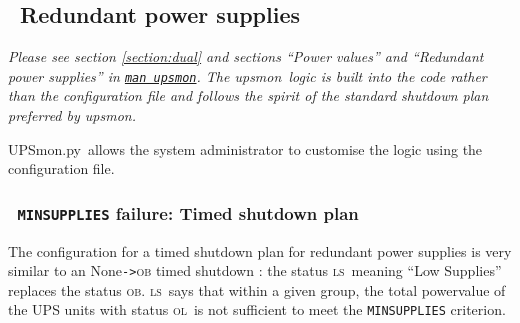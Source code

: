 \documentclass[12pt]{article}
\newlength{\headersep}\setlength{\headersep}{3mm}
\newcommand{\Hsep}{\hspace{\headersep}}
\newcommand{\upsmon}{\mbox{\textcolor{MONCOLOUR}{upsmon}}}
\newcommand{\UPSmon}{\mbox{\textcolor{UPSMONCOLOUR}{UPSmon.py}}}
\newcommand{\OB}{\textcolor{UPSDCOLOUR}{\textsc{ob}}}
\newcommand{\OL}{\textcolor{UPSDCOLOUR}{\textsc{ol}}}
\newcommand{\LS}{\textcolor{UPSMONCOLOUR}{\textsc{ls}}}
\newcommand{\None}{\textcolor{UPSMONCOLOUR}{\textsf{None}}}
\newcommand{\EVENT}[2]{\textcolor{MONCOLOUR}{#1}{\allowbreak}\texttt{\textcolor{MONCOLOUR}{->}}{\allowbreak}\textcolor{MONCOLOUR}{#2}}
\newcommand{\NUTman}[1]{\href{http://networkupstools.org/docs/man/#1.html}{\texttt{man #1}}}
\begin{document}
\subsection{\Hsep\ Redundant power supplies}\label{section:redundant}

\textit{Please see section \ref{section:dual} and sections ``Power values''
  and ``Redundant power supplies'' in \NUTman{upsmon}.  The \upsmon\ logic is
  built into the code rather than the configuration file and follows the
  spirit of the standard shutdown plan preferred by \upsmon.}

\UPSmon\ allows the system administrator to customise the logic using the
configuration file.

\subsubsection{\Hsep\ \texttt{MINSUPPLIES} failure: Timed shutdown plan}\label{section:redundant.timed}

The configuration for a timed shutdown plan for redundant power supplies is
very similar to an \EVENT{\None}{\OB} timed shutdown : the status \LS\ meaning
``Low Supplies'' replaces the status \OB.  \LS\ says that within a given group,
the total powervalue of the UPS units with status \OL\ is not sufficient to
meet the \texttt{MINSUPPLIES} criterion.
\end{document}
